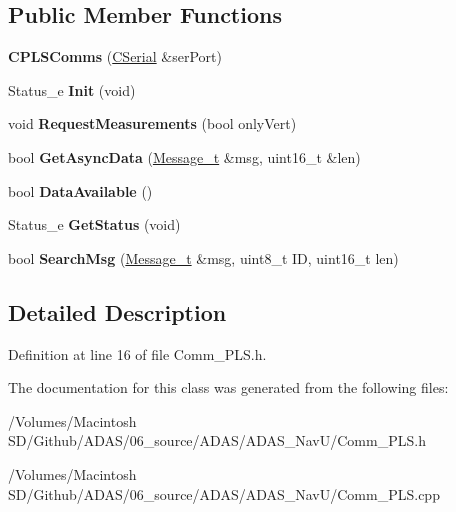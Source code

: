 \subsection*{Public Member Functions}
\begin{DoxyCompactItemize}
\item 
\mbox{\label{class_c_p_l_s_comms_ae1ec975e5e402b405389d47b8acd0a63}} 
{\bfseries C\+P\+L\+S\+Comms} (\mbox{\hyperlink{class_c_serial}{C\+Serial}} \&ser\+Port)
\item 
\mbox{\label{class_c_p_l_s_comms_ae7f8d87ea15de35a120d65a7a8bbbb76}} 
Status\+\_\+e {\bfseries Init} (void)
\item 
\mbox{\label{class_c_p_l_s_comms_ae8f7e9acdf4243b76f3c7f61cf766cfc}} 
void {\bfseries Request\+Measurements} (bool only\+Vert)
\item 
\mbox{\label{class_c_p_l_s_comms_a3124eaa4549706962c7024c7c97e82b0}} 
bool {\bfseries Get\+Async\+Data} (\mbox{\hyperlink{struct_c_p_l_s_comms_1_1_message__t}{Message\+\_\+t}} \&msg, uint16\+\_\+t \&len)
\item 
\mbox{\label{class_c_p_l_s_comms_ae9d000eff184034954829d76162654a5}} 
bool {\bfseries Data\+Available} ()
\item 
\mbox{\label{class_c_p_l_s_comms_a05149da99ab80b804699763111315f33}} 
Status\+\_\+e {\bfseries Get\+Status} (void)
\item 
\mbox{\label{class_c_p_l_s_comms_ae0cd51de8a24b261389b6f89b4b80e51}} 
bool {\bfseries Search\+Msg} (\mbox{\hyperlink{struct_c_p_l_s_comms_1_1_message__t}{Message\+\_\+t}} \&msg, uint8\+\_\+t ID, uint16\+\_\+t len)
\end{DoxyCompactItemize}


\subsection{Detailed Description}


Definition at line 16 of file Comm\+\_\+\+P\+L\+S.\+h.



The documentation for this class was generated from the following files\+:\begin{DoxyCompactItemize}
\item 
/\+Volumes/\+Macintosh S\+D/\+Github/\+A\+D\+A\+S/06\+\_\+source/\+A\+D\+A\+S/\+A\+D\+A\+S\+\_\+\+Nav\+U/Comm\+\_\+\+P\+L\+S.\+h\item 
/\+Volumes/\+Macintosh S\+D/\+Github/\+A\+D\+A\+S/06\+\_\+source/\+A\+D\+A\+S/\+A\+D\+A\+S\+\_\+\+Nav\+U/Comm\+\_\+\+P\+L\+S.\+cpp\end{DoxyCompactItemize}
